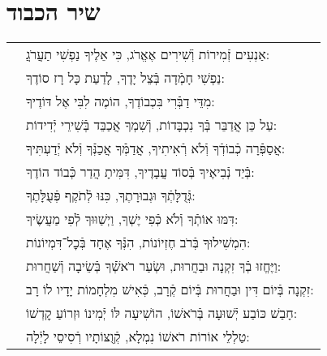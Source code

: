 \documentclass[twoside, openany, parskip=half, 11pt]{book}
\begin{document}
\section*{ שיר הכבוד }
\begin{footnotesize}
	\begin{longtable}{l p{}}
		
		\chazzan &
		אַנְעִים זְֿמִירוֹת וְֿשִׁירִים אֶאֱרֹג, כִּי אֵלֶיךָ נַפְשִׁי תַעֲרֹגֲ: \\
		
		\kahal &
		נַפְשִׁי חָמְֿדָה בְּֿצֵל יָדֶךָ, לָדַעַת כָּל רָז סוֹדֶךָ: \\
		
		\chazzan &
		מִדֵּי דַבְּֿֿרִי בִּכְבוֹדֶךָ, הוֹמֶה לִבִּי אֶל דּוֹדֶיךָ: \\
		
		\kahal &
		עַל כֵּן אֲדַבֵּר בְּֿךָ נִכְבָּדוֹת, וְֿשִׁמְךָ אֲכַבֵּד בְּֿשִׁירֵי יְֿדִידוֹת: \\
		
		\chazzan &
		אֲסַפְּֿֿרָה כְֿבוֹדְֿךָ וְֿלֹא רְֿאִיתִיךָ, אֲדַמְּֿֿךָ אֲכַנְּֿֿךָ וְֿלֹא יְֿדַעְתִּיךָ: \\
		
		\kahal &
		בְּֿיַד נְֿבִיאֶיךָ בְּֿסוֹד עֲבָדֶיךָ, דִּמִּיתָ הֲדַר כְּֿבוֹד הוֹדֶךָ: \\
		
		\chazzan &
		גְּֿדֻלָּתְֿךָ וּגְבוּרָתֶךָ, כִּנּוּ לְֿתֹקֶף פְּֿעֻלָּתֶךָ: \\
		
		\kahal &
		דִּמּוּ אוֹתְֿךָ וְֿלֹא כְּֿפִי יֶשְׁךָ, וַיְשַׁוּוּךָ לְֿפִי מַעֲשֶׂיךָ: \\
		
		\chazzan &
		הִמְשִׁילוּךָ בְּֿרֹב חֶזְיוֹנוֹת, הִנְּֿֿךָ אֶחָד בְּֿכׇל־דִּמְיוֹנוֹת: \\
		
		\kahal &
		וַיֶּחֱזוּ בְֿךָ זִקְנָה וּבַחֲרוּת, וּשְׂעַר רֹאשְֿֿׁךָ בְּֿשֵׂיבָה וְֿשַׁחֲרוּת: \\
		
		\chazzan &
		זִקְנָה בְּֿיוֹם דִּין וּבַחֲרוּת בְּֿיוֹם קְֿרָב, כְּֿאִישׁ מִלְחָמוֹת יָדָיו לוֹ רָב: \\
		
		\kahal &
		חָבַשׁ כּוֹבַע יְֿשׁוּעָה בְּֿרֹאשׁוֹ, הוֹשִׁיעָה לּוֹ יְֿמִינוֹ וּזְרוֹעַ קׇדְשׁוֹ: \\
		
		\chazzan &
		טַלְלֵי אוֹרוֹת רֹאשׁוֹ נִמְלָא, קְֿוֻצּוֹתָיו רְֿסִיסֵי לָיְֿלָה: \\
		

\end{longtable}
\end{footnotesize}
\end{document}
